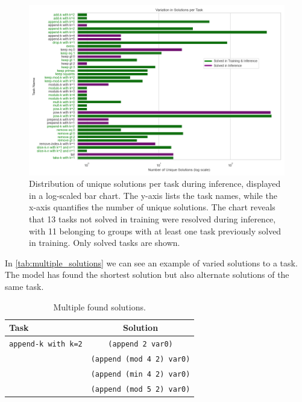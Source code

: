 \begin{figure}[H]
    \centering
    \includegraphics[width=\textwidth]{../img/plot_solution_variations_depth_3_48_tasks2023-12-07 22:24:45_inference.png}
    \caption{Distribution of unique solutions per task during inference, displayed in a log-scaled bar chart. The y-axis lists the task names, while the x-axis quantifies the number of unique solutions. The chart reveals that 13 tasks not solved in training were resolved during inference, with 11 belonging to groups with at least one task previously solved in training. Only solved tasks are shown.}
    \label{fig:solution_variations_inference}
    \end{figure}

In \autoref{tab:multiple_solutions} we can see an example of varied solutions to a task. The model has found the shortest solution but also alternate solutions of the same task.

\begin{table}[H]
    \centering
    \begin{tabular}{|l|c|}
        \hline
        \textbf{Task} & \textbf{Solution}  \\\hline
        \texttt{append-k with k=2} & \texttt{(append 2 var0)} \\
        \texttt{} & \texttt{(append (mod 4 2) var0)} \\
        \texttt{} & \texttt{(append (min 4 2) var0)} \\
        \texttt{} & \texttt{(append (mod 5 2) var0)} \\
        \hline
    \end{tabular}
    \caption{Multiple found solutions.}
    \label{tab:multiple_solutions}
\end{table}

